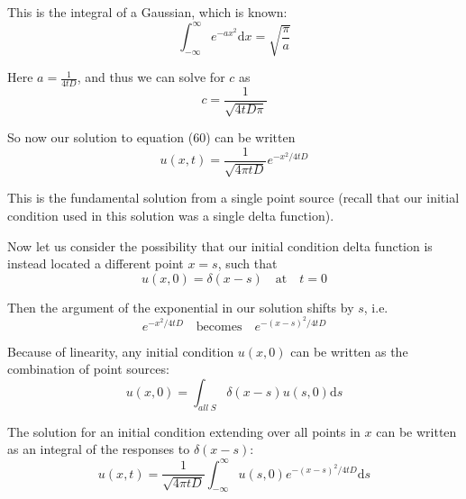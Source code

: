 \documentclass[draft, jgrga]{AGUTeX}
\begin{document}
\begin{article}
This is the integral of a Gaussian, which is known:
\begin{equation}
\int^\infty_{-\infty} e^{-ax^2} \mathrm{d}x = \sqrt{\frac{\pi}{a}} \nonumber
\end{equation}

Here \begin{math} a = \frac{1}{4tD} \end{math}, and thus we can solve for $c$ as
\begin{equation}
c = \frac{1}{\sqrt{4tD \pi}}
\end{equation}

So now our solution to equation (60) can be written
\begin{equation}
u(x,t) = \frac{1}{\sqrt{4 \pi tD}} e^{-x^2/4tD}
\end{equation}

This is the fundamental solution from a single point source (recall that our initial condition used in this solution was a single delta function).

Now let us consider the possibility that our initial condition delta function is instead located a different point \begin{math} x = s \end{math}, such that
\begin{equation}
u(x,0) = \delta (x-s) \quad \mbox{at} \quad t=0 \nonumber
\end{equation}

Then the argument of the exponential in our solution shifts by $s$, i.e.
\begin{equation}
e^{-x^2/4tD} \quad \mbox{becomes} \quad e^{-(x-s)^2/4tD} \nonumber
\end{equation}

Because of linearity, any initial condition \begin{math} u(x,0) \end{math} can be written as the combination of point sources:
\begin{equation}
u(x,0) = \int_{all \; S} \delta (x-s) u(s,0) \mathrm{d}s \nonumber
\end{equation}

The solution for an initial condition extending over all points in $x$ can be written as an integral of the responses to $\delta(x-s)$:
\begin{equation}
u(x,t) = \frac{1}{\sqrt{4 \pi tD}} \int^{\infty}_{-\infty} u(s,0)
e^{-(x-s)^2/4tD} \mathrm{d}s
\end{equation}


\end{article}
\end{document}
